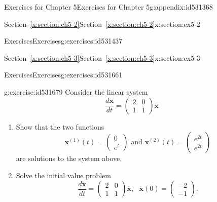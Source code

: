 \documentclass[oneside,10pt,]{book}
\newcommand{\xreffont}{\relax}
\numberwithin{equation}{section}
\numberwithin{equation}{section}
\newcommand{\amp}{&}
\begin{document}
\begin{appendixptx}{Exercises for Chapter 5}{}{Exercises for Chapter 5}{}{}{g:appendix:id531368}
\begin{sectionptx}{Section~{\xreffont\ref*{x:section:ch5-2}}}{}{Section~{\xreffont\ref*{x:section:ch5-2}}}{}{}{x:section:ex5-2}
\begin{exercises-subsection-numberless}{Exercises}{}{Exercises}{}{}{g:exercises:id531437}
\end{exercises-subsection-numberless}
\end{sectionptx}
%
%
\typeout{************************************************}
\typeout{Section F.3 Section~{\xreffont\ref*{x:section:ch5-3}}}
\typeout{************************************************}
%
\begin{sectionptx}{Section~{\xreffont\ref*{x:section:ch5-3}}}{}{Section~{\xreffont\ref*{x:section:ch5-3}}}{}{}{x:section:ex5-3}
%
%
\typeout{************************************************}
\typeout{************************************************}
%
\begin{exercises-subsection-numberless}{Exercises}{}{Exercises}{}{}{g:exercises:id531661}
\begin{divisionexercise}{1}{}{}{g:exercise:id531679}%
Consider the linear system%
\begin{equation*}
\frac{d\mathbf{x}}{dt}=\left(\begin{array}{cc}
2 \amp 0\\
1 \amp 1
\end{array}\right)\mathbf{x}
\end{equation*}
%
%
\begin{enumerate}[label=(\alph*)]
\item{}Show that the two functions%
\begin{equation*}
\mathbf{x}^{(1)}(t)=\left(\begin{array}{c}
0\\
e^{t}
\end{array}\right)\text{ and }\mathbf{x}^{(2)}(t)=\left(\begin{array}{c}
e^{2t}\\
e^{2t}
\end{array}\right)
\end{equation*}
are solutions to the system above.%
\item{}Solve the initial value problem%
\begin{equation*}
\frac{d\mathbf{x}}{dt}=\left(\begin{array}{cc}
2 \amp 0\\
1 \amp 1
\end{array}\right)\mathbf{x},\,\,\,\,\mathbf{x}(0)=\left(\begin{array}{c}
-2\\
-1
\end{array}\right).
\end{equation*}
%
\end{enumerate}
\end{divisionexercise}%

\end{exercises-subsection-numberless}
\end{sectionptx}
\end{appendixptx}
\end{document}
